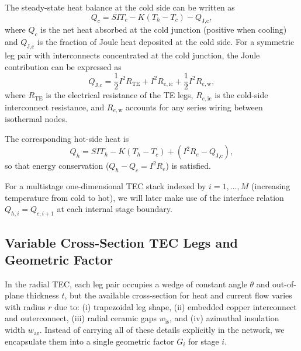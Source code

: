 \documentclass[conference]{IEEEtran}
\begin{document}
The steady-state heat balance at the cold side can be written as
\begin{equation}
	Q_c = S I T_c - K (T_h - T_c) - Q_{\text{J,c}},
	\label{eq:Qc_def}
\end{equation}
where $Q_c$ is the net heat absorbed at the cold junction (positive when cooling) and $Q_{\text{J,c}}$ is the fraction of Joule heat deposited at the cold side. For a symmetric leg pair with interconnects concentrated at the cold junction, the Joule contribution can be expressed as
\begin{equation}
	Q_{\text{J,c}} = \frac{1}{2} I^2 R_{\text{TE}} + I^2 R_{e,\text{ic}} + \frac{1}{2} I^2 R_{e,\text{w}},
	\label{eq:Qjoule_cold}
\end{equation}
where $R_{\text{TE}}$ is the electrical resistance of the TE legs, $R_{e,\text{ic}}$ is the cold-side interconnect resistance, and $R_{e,\text{w}}$ accounts for any series wiring between isothermal nodes.

The corresponding hot-side heat is
\begin{equation}
	Q_h = S I T_h - K (T_h - T_c) + (I^2 R_e - Q_{\text{J,c}}),
	\label{eq:Qh_def}
\end{equation}
so that energy conservation ($Q_h - Q_c = I^2 R_e$) is satisfied.

For a multistage one-dimensional TEC stack indexed by $i=1,\dots,M$ (increasing temperature from cold to hot), we will later make use of the interface relation $Q_{h,i} = Q_{c,i+1}$ at each internal stage boundary.

\subsection{Variable Cross-Section TEC Legs and Geometric Factor}

In the radial TEC, each leg pair occupies a wedge of constant angle $\theta$ and out-of-plane thickness $t$, but the available cross-section for heat and current flow varies with radius $r$ due to: (i) trapezoidal leg shape, (ii) embedded copper interconnect and outerconnect, (iii) radial ceramic gaps $w_{\text{is}}$, and (iv) azimuthal insulation width $w_{\text{az}}$. Instead of carrying all of these details explicitly in the network, we encapsulate them into a single geometric factor $G_i$ for stage $i$.
\end{document}

